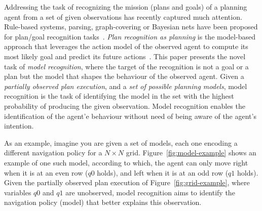 \documentclass[letterpaper]{article} %
\newcommand{\strips}{\textsc{Strips}}     %
\begin{document}
Addressing the task of recognizing the mission (plans and goals) of a planning agent from a set of given observations has recently captured much attention. Rule-based systems, parsing, graph-covering or Bayesian nets have been proposed for plan/goal recognition tasks~\cite{sukthankar14}. {\em Plan recognition as planning} is the model-based approach that leverages the action model of the observed agent to compute its most likely goal and predict its future actions~\cite{ramirez2009plan,RamirezG10}. This paper presents the novel task of \emph{model recognition}, where the target of the recognition is not a goal or a plan but the model that shapes the behaviour of the observed agent. Given a \emph{partially observed plan execution}, and a \emph{set of possible planning models}, model recognition is the task of identifying the model in the set with the highest probability of producing the given observation. Model recognition enables the identification of the agent'e behaviour without need of being aware of the agent's intention.


As an example, imagine you are given a set of models, each one encoding a different navigation policy for a $N\times N$ grid. Figure~\ref{fig:model-example} shows an example of one such model, according to which, the agent can only move right when it is at an even row ({\tt\small $q0$} holds), and left when it is at an odd row ({\tt\small $q1$} holds). Given the partially observed plan execution of Figure~\ref{fig:grid-example}, where variables {\small\tt $q0$} and {\small\tt $q1$} are unobserved, model recognition aims to identify the navigation policy (model) that better explains this observation.

\end{document}
